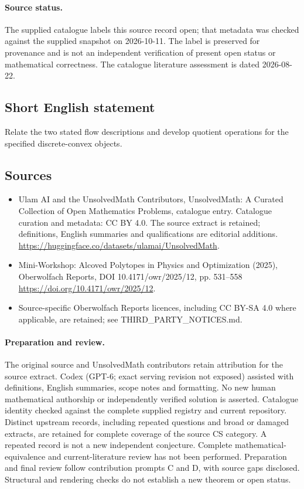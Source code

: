 \documentclass[11pt]{article}
\begin{document}
\paragraph{Source status.}
The supplied catalogue labels this source record open; that metadata was checked against the supplied snapshot on 2026-10-11. The label is preserved for provenance and is not an independent verification of present open status or mathematical correctness. The catalogue literature assessment is dated 2026-08-22.
\subsection{Short English statement}
Relate the two stated flow descriptions and develop quotient operations for the specified discrete-convex objects.
\subsection{Sources}
\begin{itemize}
\item[\hypertarget{source:statement:1}{S1}] Ulam AI and the UnsolvedMath Contributors, UnsolvedMath: A Curated Collection of Open Mathematics Problems, catalogue entry. Catalogue curation and metadata: CC BY 4.0. The source extract is retained; definitions, English summaries and qualifications are editorial additions.
\url{https://huggingface.co/datasets/ulamai/UnsolvedMath}.
\item[\hypertarget{source:statement:2}{S2}] Mini-Workshop: Alcoved Polytopes in Physics and Optimization (2025), Oberwolfach Reports, DOI 10.4171/owr/2025/12, pp. 531--558
\url{https://doi.org/10.4171/owr/2025/12}.
\item Source-specific Oberwolfach Reports licences, including CC BY-SA 4.0 where applicable, are retained; see THIRD\_PARTY\_NOTICES.md.
\end{itemize}
\paragraph{Preparation and review.}
The original source and UnsolvedMath contributors retain attribution for the source extract. Codex (GPT-6; exact serving revision not exposed) assisted with definitions, English summaries, scope notes and formatting. No new human mathematical authorship or independently verified solution is asserted. Catalogue identity checked against the complete supplied registry and current repository. Distinct upstream records, including repeated questions and broad or damaged extracts, are retained for complete coverage of the source CS category. A repeated record is not a new independent conjecture. Complete mathematical-equivalence and current-literature review has not been performed. Preparation and final review follow contribution prompts C and D, with source gaps disclosed. Structural and rendering checks do not establish a new theorem or open status.
\label{end:statement}
\end{document}
